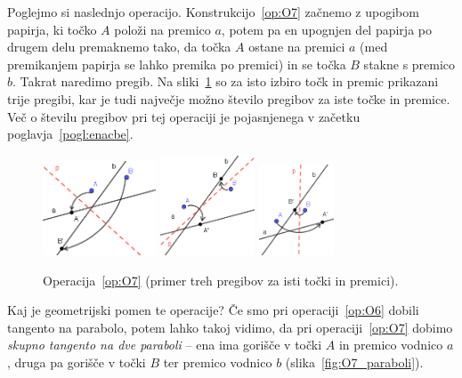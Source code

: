 Poglejmo si naslednjo operacijo. Konstrukcijo~\ref{op:O7} začnemo z upogibom papirja, ki točko $A$ položi na premico $a$, potem pa en upognjen del papirja po drugem delu premaknemo tako, da točka $A$ ostane na premici $a$ (med premikanjem papirja se lahko premika po premici) in se točka $B$ stakne s premico $b$. Takrat naredimo pregib. Na sliki~\ref{fig:O7} so za isto izbiro točk in premic prikazani trije pregibi, kar je tudi največje možno število pregibov za iste točke in premice. Več o številu pregibov pri tej operaciji je pojasnjenega v začetku poglavja~\ref{pogl:enacbe}.

\begin{figure}[h]
    \centering
    \includegraphics[width=0.3\textwidth]{images/origami_operacije/O7b.png}
    \includegraphics[width=0.25\textwidth]{images/origami_operacije/O7a.png}
    \includegraphics[width=0.2\textwidth]{images/origami_operacije/O7c.png}
    \caption[Operacija~\ref{op:O7}]{Operacija~\ref{op:O7} (primer treh pregibov za isti točki in premici).}
    \label{fig:O7}
\end{figure}

Kaj je geometrijski pomen te operacije? Če smo pri operaciji~\ref{op:O6} dobili tangento na parabolo, potem lahko takoj vidimo, da pri operaciji~\ref{op:O7} dobimo \emph{skupno tangento na dve paraboli} -- ena ima gorišče v točki $A$ in premico vodnico $a$, druga pa gorišče v točki $B$ ter premico vodnico $b$ (slika~\ref{fig:O7_paraboli}).

